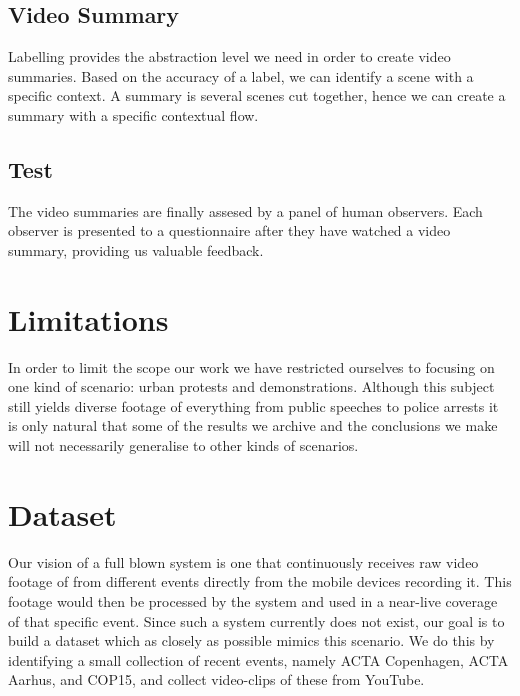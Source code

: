 \subsection{Video Summary}
%
Labelling provides the abstraction level we need in order to create video summaries. Based on the accuracy of a label, we can identify a scene with a specific context. A summary is several scenes cut together, hence we can create a summary with a specific contextual flow.
%
\subsection{Test}
%
The video summaries are finally assesed by a panel of human observers. Each observer is presented to a questionnaire after they have watched a video summary, providing us valuable feedback.
%
\section{Limitations}
%
%
%
%
%
In order to limit the scope our work we have restricted ourselves to focusing on one kind of scenario: urban protests and demonstrations. Although this subject still yields diverse footage of everything from public speeches to police arrests it is only natural that some of the results we archive and the conclusions we make will not necessarily generalise to other kinds of scenarios.
%
\section{Dataset}\label{sec:dataset}
%
Our vision of a full blown system is one that continuously receives raw video footage of from different events directly from the mobile devices recording it. This footage would then be processed by the system and used in a near-live coverage of that specific event. Since such a system currently does not exist, our goal is to build a dataset which as closely as possible mimics this scenario. We do this by identifying a small collection of recent events, namely ACTA Copenhagen, ACTA Aarhus, and COP15, and collect video-clips of these from YouTube.
%
